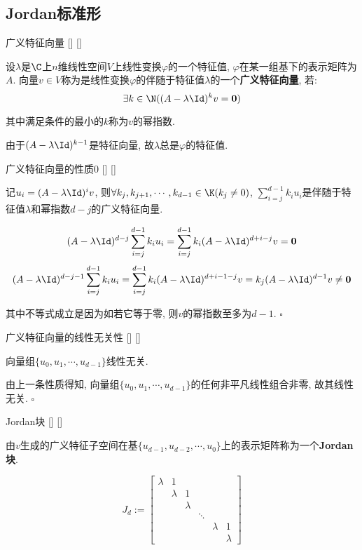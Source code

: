 \documentclass[UTF8]{ctexart}
\begin{document}
	\subsection{Jordan标准形}
	
		\begin{dfn}
			[]
			{广义特征向量}
			[]
			[]

			设$\lambda$是$\C$上$n$维线性空间$V$上线性变换$\varphi$的一个特征值, $\varphi$在某一组基下的表示矩阵为$A$. 向量$v\in V$称为是线性变换$\varphi$的伴随于特征值$\lambda$的一个\textbf{广义特征向量}, 若: 
			\[\exists k\in\N((A-\lambda\Id)^k v=\mathbf{0})\]

			其中满足条件的最小的$k$称为$v$的幂指数. 

			由于$(A-\lambda\Id)^{k-1}$是特征向量, 故$\lambda$总是$\varphi$的特征值. 
		\end{dfn}
		
		\begin{ppt}
			[]
			{广义特征向量的性质0}
			[]
			[]

			记$u_i=(A-\lambda\Id)^i v$, 则$\forall k_j,k_{j+1},\cdots,k_{d-1}\in\K(k_j\neq 0)$, $\sum\limits_{i=j}^{d-1}k_i u_i$是伴随于特征值$\lambda$和幂指数$d-j$的广义特征向量. 
		\end{ppt}

		\begin{prf} 
			\[(A-\lambda\Id)^{d-j}\sum_{i=j}^{d-1}k_i u_i=\sum_{i=j}^{d-1}k_i (A-\lambda\Id)^{d+i-j} v=\mathbf{0}\]
			\[(A-\lambda\Id)^{d-j-1}\sum_{i=j}^{d-1}k_i u_i=\sum_{i=j}^{d-1}k_i (A-\lambda\Id)^{d+i-1-j} v=k_j(A-\lambda\Id)^{d-1} v\neq\mathbf{0}\]

			其中不等式成立是因为如若它等于零, 则$v$的幂指数至多为$d-1$. $\square$
		\end{prf}
		\begin{ppt}
			[]
			{广义特征向量的线性无关性}
			[]
			[]

			向量组$\{u_0,u_1,\cdots,u_{d-1}\}$线性无关. 
		\end{ppt}

		\begin{prf} 
		
			由上一条性质得知, 向量组$\{u_0,u_1,\cdots,u_{d-1}\}$的任何非平凡线性组合非零, 故其线性无关. $\square$
		\end{prf}
		\begin{dfn}
			[]
			{Jordan块}
			[]
			[]

			由$v$生成的广义特征子空间在基$\{u_{d-1},u_{d-2},\cdots,u_0\}$上的表示矩阵称为一个\textbf{Jordan块}. 
		
			\[J_d:=
			\begin{bmatrix}
				\lambda & 1\\
				 & \lambda & 1\\
				 & & \lambda\\ 
				 & & & \ddots\\
				 & & & & \lambda & 1\\
				 & & & & & \lambda
			\end{bmatrix}\]
		\end{dfn}
\end{document}
